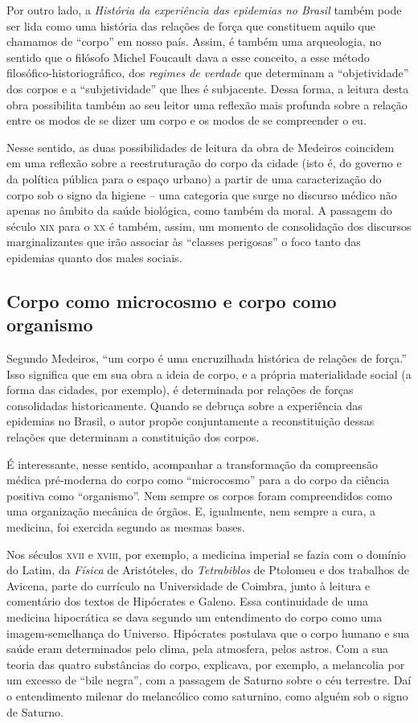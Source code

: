 \documentclass[12pt]{extarticle}
\begin{document}
Por outro lado, a \emph{História da experiência das epidemias no Brasil}
também pode ser lida como uma história das relações de força que
constituem aquilo que chamamos de ``corpo'' em nosso país. Assim, é
também uma arqueologia, no sentido que o filósofo Michel Foucault dava a
esse conceito, a esse método filosófico-historiográfico, dos
\emph{regimes de verdade} que determinam a ``objetividade'' dos corpos e
a ``subjetividade'' que lhes é subjacente. Dessa forma, a leitura desta
obra possibilita também ao seu leitor uma reflexão mais profunda sobre a
relação entre os modos de se dizer um corpo e os modos de se compreender
o eu.

Nesse sentido, as duas possibilidades de leitura da obra de Medeiros
coincidem em uma reflexão sobre a reestruturação do corpo da cidade
(isto é, do governo e da política pública para o espaço urbano) a partir
de uma caracterização do corpo sob o signo da higiene -- uma categoria
que surge no discurso médico não apenas no âmbito da saúde biológica,
como também da moral. A passagem do século \textsc{xix} para o \textsc{xx} é também,
assim, um momento de consolidação dos discursos marginalizantes que irão
associar às ``classes perigosas'' o foco tanto das epidemias quanto dos
males sociais.

\subsection{Corpo como microcosmo e corpo como organismo}

Segundo Medeiros, ``um corpo é uma encruzilhada histórica de relações de
força.'' Isso significa que em sua obra a ideia de corpo, e a própria
materialidade social (a forma das cidades, por exemplo), é determinada
por relações de forças consolidadas historicamente. Quando se debruça
sobre a experiência das epidemias no Brasil, o autor propõe
conjuntamente a reconstituição dessas relações que determinam a
constituição dos corpos.

É interessante, nesse sentido, acompanhar a transformação da compreensão
médica pré-moderna do corpo como ``microcosmo'' para a do corpo da
ciência positiva como ``organismo''. Nem sempre os corpos foram
compreendidos como uma organização mecânica de órgãos. E, igualmente,
nem sempre a cura, a medicina, foi exercida segundo as mesmas bases.

Nos séculos \textsc{xvii} e \textsc{xviii}, por exemplo, a medicina imperial se fazia com
o domínio do Latim, da \emph{Física} de Aristóteles, do
\emph{Tetrabiblos} de Ptolomeu e dos trabalhos de Avicena, parte do
currículo na Universidade de Coimbra, junto à leitura e comentário dos
textos de Hipócrates e Galeno. Essa continuidade de uma medicina
hipocrática se dava segundo um entendimento do corpo como uma
imagem-semelhança do Universo. Hipócrates postulava que o corpo humano e
sua saúde eram determinados pelo clima, pela atmosfera, pelos astros.
Com a sua teoria das quatro substâncias do corpo, explicava, por
exemplo, a melancolia por um excesso de ``bile negra'', com a passagem
de Saturno sobre o céu terrestre. Daí o entendimento milenar do
melancólico como saturnino, como alguém sob o signo de Saturno.
\end{document}
